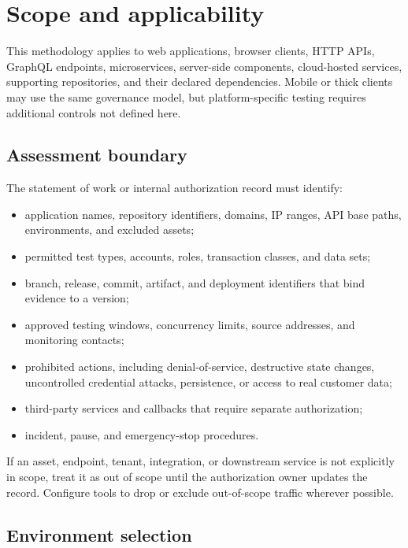 \documentclass[11pt,letterpaper]{article}
\begin{document}
\section{Scope and applicability}

This methodology applies to web applications, browser clients, HTTP APIs, GraphQL endpoints, microservices, server-side components, cloud-hosted services, supporting repositories, and their declared dependencies. Mobile or thick clients may use the same governance model, but platform-specific testing requires additional controls not defined here.

\subsection{Assessment boundary}

The statement of work or internal authorization record must identify:

\begin{itemize}
  \item application names, repository identifiers, domains, IP ranges, API base paths, environments, and excluded assets;
  \item permitted test types, accounts, roles, transaction classes, and data sets;
  \item branch, release, commit, artifact, and deployment identifiers that bind evidence to a version;
  \item approved testing windows, concurrency limits, source addresses, and monitoring contacts;
  \item prohibited actions, including denial-of-service, destructive state changes, uncontrolled credential attacks, persistence, or access to real customer data;
  \item third-party services and callbacks that require separate authorization;
  \item incident, pause, and emergency-stop procedures.
\end{itemize}

\begin{decisionbox}
If an asset, endpoint, tenant, integration, or downstream service is not explicitly in scope, treat it as out of scope until the authorization owner updates the record. Configure tools to drop or exclude out-of-scope traffic wherever possible.
\end{decisionbox}

\subsection{Environment selection}
\end{document}
